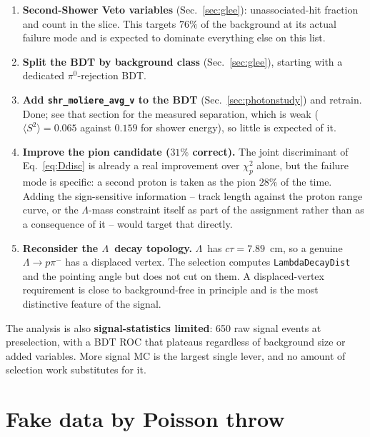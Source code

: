 \documentclass[11pt,a4paper]{article}
\newcommand{\Lam}{\ensuremath{\Lambda}}
\begin{document}
\begin{enumerate}
  \item \textbf{Second-Shower Veto variables} (Sec.~\ref{sec:glee}): unassociated-hit
        fraction and count in the slice. This targets $76\%$ of the background at its
        actual failure mode and is expected to dominate everything else on this list.
  \item \textbf{Split the BDT by background class} (Sec.~\ref{sec:glee}), starting
        with a dedicated $\pi^0$-rejection BDT.
  \item \textbf{Add \texttt{shr\_moliere\_avg\_v} to the BDT}
        (Sec.~\ref{sec:photonstudy}) and retrain. Done; see that section for the
        measured separation, which is weak ($\langle S^2\rangle = 0.065$ against
        $0.159$ for shower energy), so little is expected of it.
  \item \textbf{Improve the pion candidate ($31\%$ correct).} The joint
        discriminant of Eq.~\ref{eq:Ddisc} is already a real improvement over
        $\chi^2_p$ alone, but the failure mode is specific: a second proton is
        taken as the pion $28\%$ of the time. Adding the sign-sensitive
        information -- track length against the proton range curve, or the
        $\Lam$-mass constraint itself as part of the assignment rather than as a
        consequence of it -- would target that directly.
  \item \textbf{Reconsider the \Lam\ decay topology.} \Lam\ has $c\tau = 7.89$~cm,
        so a genuine $\Lam \to p\pi^-$ has a displaced vertex. The selection
        computes \texttt{LambdaDecayDist} and the pointing angle but does not cut
        on them. A displaced-vertex requirement is close to background-free in
        principle and is the most distinctive feature of the signal.
\end{enumerate}

\noindent The analysis is also \textbf{signal-statistics limited}: 650 raw signal
events at preselection, with a BDT ROC that plateaus regardless of background size
or added variables. More signal MC is the largest single lever, and no amount of
selection work substitutes for it.

\section{Fake data by Poisson throw}
\label{sec:fakedata}
\end{document}

